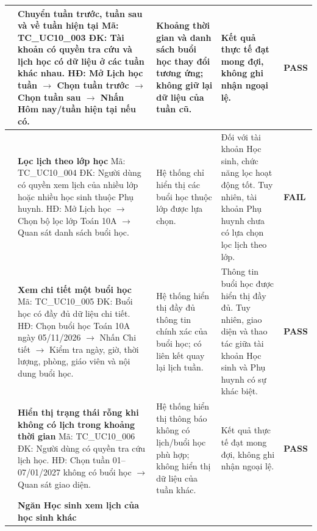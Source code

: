 \begin{longtable}{|>{\centering\arraybackslash}p{0.8cm}|>{\raggedright\arraybackslash}p{4.6cm}|>{\raggedright\arraybackslash}p{3.8cm}|>{\raggedright\arraybackslash}p{3.8cm}|>{\centering\arraybackslash}p{1.5cm}|}
\hline
3 & \textbf{Chuyển tuần trước, tuần sau và về tuần hiện tại}\newline
Mã: TC\_UC10\_003\newline
ĐK: Tài khoản có quyền tra cứu và lịch học có dữ liệu ở các tuần khác nhau.\newline
HĐ: Mở Lịch học tuần $\rightarrow$ Chọn tuần trước $\rightarrow$ Chọn tuần sau $\rightarrow$ Nhấn Hôm nay/tuần hiện tại nếu có. &
Khoảng thời gian và danh sách buổi học thay đổi tương ứng; không giữ lại dữ liệu của tuần cũ. &
Kết quả thực tế đạt mong đợi, không ghi nhận ngoại lệ. & \textbf{PASS} \\
\hline
4 & \textbf{Lọc lịch theo lớp học}\newline
Mã: TC\_UC10\_004\newline
ĐK: Người dùng có quyền xem lịch của nhiều lớp hoặc nhiều học sinh thuộc Phụ huynh.\newline
HĐ: Mở Lịch học $\rightarrow$ Chọn bộ lọc lớp Toán 10A $\rightarrow$ Quan sát danh sách buổi học. &
Hệ thống chỉ hiển thị các buổi học thuộc lớp được lựa chọn. &
Đối với tài khoản Học sinh, chức năng lọc hoạt động tốt. Tuy nhiên, tài khoản Phụ huynh chưa có lựa chọn lọc lịch theo lớp. & \textbf{FAIL} \\
\hline
5 & \textbf{Xem chi tiết một buổi học}\newline
Mã: TC\_UC10\_005\newline
ĐK: Buổi học có đầy đủ dữ liệu chi tiết.\newline
HĐ: Chọn buổi học Toán 10A ngày 05/11/2026 $\rightarrow$ Nhấn Chi tiết $\rightarrow$ Kiểm tra ngày, giờ, thời lượng, phòng, giáo viên và nội dung buổi học. &
Hệ thống hiển thị đầy đủ thông tin chính xác của buổi học; có liên kết quay lại lịch tuần. &
Thông tin buổi học được hiển thị đầy đủ. Tuy nhiên, giao diện và thao tác giữa tài khoản Học sinh và Phụ huynh có sự khác biệt. & \textbf{PASS} \\
\hline
6 & \textbf{Hiển thị trạng thái rỗng khi không có lịch trong khoảng thời gian}\newline
Mã: TC\_UC10\_006\newline
ĐK: Người dùng có quyền tra cứu lịch học.\newline
HĐ: Chọn tuần 01--07/01/2027 không có buổi học $\rightarrow$ Quan sát giao diện. &
Hệ thống hiển thị thông báo không có lịch/buổi học phù hợp; không hiển thị dữ liệu của tuần khác. &
Kết quả thực tế đạt mong đợi, không ghi nhận ngoại lệ. & \textbf{PASS} \\
\hline
7 & \textbf{Ngăn Học sinh xem lịch của học sinh khác}\newline

\end{longtable}
